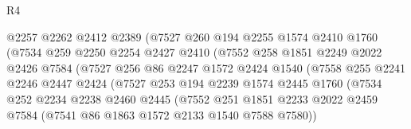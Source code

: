 \begin{lexlean}{R4}
\begin{coremodule}
                              @2257
                              @2262
                              @2412
                              @2389
                              (@7527
                                @260
                                @194
                                @2255
                                @1574
                                @2410
                                @1760
                                (@7534
                                  @259
                                  @2250
                                  @2254
                                  @2427
                                  @2410
                                  (@7552
                                    @258
                                    @1851
                                    @2249
                                    @2022
                                    @2426
                                    @7584
                                    (@7527
                                      @256
                                      @86
                                      @2247
                                      @1572
                                      @2424
                                      @1540
                                      (@7558
                                        @255
                                        @2241
                                        @2246
                                        @2447
                                        @2424
                                        (@7527
                                          @253
                                          @194
                                          @2239
                                          @1574
                                          @2445
                                          @1760
                                          (@7534
                                            @252
                                            @2234
                                            @2238
                                            @2460
                                            @2445
                                            (@7552
                                              @251
                                              @1851
                                              @2233
                                              @2022
                                              @2459
                                              @7584
                                              (@7541 @86 @1863 @1572 @2133 @1540 @7588 @7580))

\end{coremodule}
\end{lexlean}

